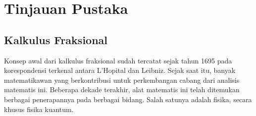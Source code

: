 \chapter{Tinjauan Pustaka}

\section{Kalkulus Fraksional}
Konsep awal dari kalkulus fraksional sudah tercatat sejak tahun 1695 pada korespondensi terkenal antara L'Hopital dan Leibniz. Sejak saat itu, banyak matematikawan yang berkontribusi untuk perkembangan cabang dari analisis matematis ini. Beberapa dekade terakhir, alat matematis ini telah ditemukan berbagai penerapannya pada berbagai bidang. Salah satunya adalah fisika, secara khusus fisika kuantum. \cite{Zhou2023Fractional}

